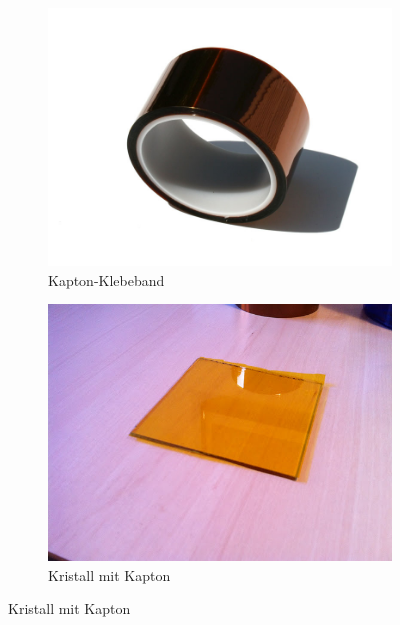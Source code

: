 \documentclass[11pt,a4paper]{article}
\begin{document}
\begin{figure}[H]
    \centering
    \begin{subfigure}[b]{0.4\textwidth}
        \includegraphics[width=\textwidth,cfbox=azul_marcos 4pt 0pt]{FOTOS/KAPTON1}
	\caption*{Kapton-Klebeband}
    \end{subfigure}
    \qquad %
    \begin{subfigure}[b]{0.4\textwidth}
        \includegraphics[width=\textwidth,cfbox=azul_marcos 4pt 0pt]{FOTOS/KAPTON2}
	\caption*{Kristall mit Kapton}
    \end{subfigure}   
\end{figure}
\end{document}
